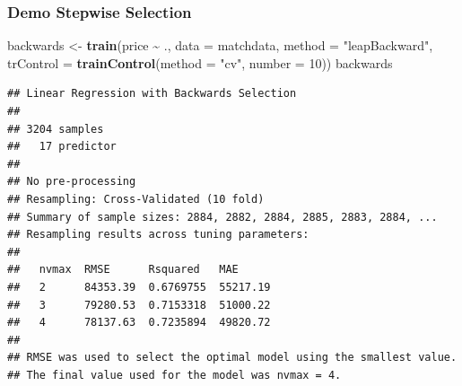 \documentclass[
  shownotes,
  xcolor={svgnames},
  hyperref={colorlinks,citecolor=DarkBlue,linkcolor=DarkRed,urlcolor=DarkBlue}
  ]{beamer}
\newenvironment{Shaded}{\begin{snugshade}}{\end{snugshade}}
\newcommand{\DataTypeTok}[1]{\textcolor[rgb]{0.13,0.29,0.53}{#1}}
\newcommand{\DecValTok}[1]{\textcolor[rgb]{0.00,0.00,0.81}{#1}}
\newcommand{\KeywordTok}[1]{\textcolor[rgb]{0.13,0.29,0.53}{\textbf{#1}}}
\newcommand{\NormalTok}[1]{#1}
\newcommand{\OperatorTok}[1]{\textcolor[rgb]{0.81,0.36,0.00}{\textbf{#1}}}
\newcommand{\StringTok}[1]{\textcolor[rgb]{0.31,0.60,0.02}{#1}}
\begin{document}
\begin{frame}[fragile]
\frametitle{Demo Stepwise Selection}

\begin{scriptsize}
\begin{Shaded}
\begin{Highlighting}[]
\NormalTok{backwards \textless{}{-}}\StringTok{ }\KeywordTok{train}\NormalTok{(price }\OperatorTok{\textasciitilde{}}\StringTok{ }\NormalTok{., }\DataTypeTok{data =}\NormalTok{ matchdata,}
              \DataTypeTok{method =} \StringTok{"leapBackward"}\NormalTok{,}
              \DataTypeTok{trControl =} \KeywordTok{trainControl}\NormalTok{(}\DataTypeTok{method =} \StringTok{"cv"}\NormalTok{, }\DataTypeTok{number =} \DecValTok{10}\NormalTok{))}
\NormalTok{backwards}
\end{Highlighting}
\end{Shaded}
\end{scriptsize}
\begin{tiny}
\begin{verbatim}
## Linear Regression with Backwards Selection 
## 
## 3204 samples
##   17 predictor
## 
## No pre-processing
## Resampling: Cross-Validated (10 fold) 
## Summary of sample sizes: 2884, 2882, 2884, 2885, 2883, 2884, ... 
## Resampling results across tuning parameters:
## 
##   nvmax  RMSE      Rsquared   MAE     
##   2      84353.39  0.6769755  55217.19
##   3      79280.53  0.7153318  51000.22
##   4      78137.63  0.7235894  49820.72
## 
## RMSE was used to select the optimal model using the smallest value.
## The final value used for the model was nvmax = 4.
\end{verbatim}
\end{tiny}
\end{frame}
\end{document}
